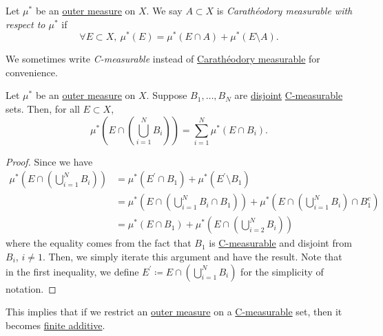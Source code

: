 \begin{definition}\label{def:C-measurable}
	Let \(\mu^{\ast} \) be an \hyperref[def:outer-measure]{outer measure} on \(X\). We say \(A\subset X\) is \emph{Carathéodory measurable with respect to \(\mu^{\ast} \)} if
	\[
		\forall E\subset X,\ \mu^{\ast} (E) = \mu^{\ast} \left(E\cap A\right) + \mu^{\ast} \left(E\setminus A\right).
	\]
\end{definition}
\begin{note}
	We sometimes write \emph{C-measurable} instead of \hyperref[def:C-measurable]{Carathéodory measurable} for convenience.
\end{note}
\begin{lemma}\label{lma:disjoint-C-measurable-finite-additive}
	Let \(\mu^{\ast} \) be an \hyperref[def:outer-measure]{outer measure} on \(X\). Suppose \(B_1, \dots , B_N \) are \underline{disjoint} \hyperref[def:C-measurable]{C-measurable} sets. Then, for all \(E\subset X\),
	\[
		\mu^{\ast} \left(E\cap \left(\bigcup_{i=1}^{N} B_{i}\right)\right) = \sum_{i=1}^{N} \mu^{\ast} \left(E\cap B_i\right).
	\]
\end{lemma}
\begin{proof}
	Since we have
	\[
		\begin{split}
			\mu^{\ast} \left(E\cap \left(\bigcup_{i=1}^{N} B_{i}\right)\right)
			 & = \mu^{\ast} \left( E^\prime  \cap B_1\right) + \mu^{\ast} \left(E ^\prime \setminus B_1\right)                                                               \\
			 & = \mu^{\ast} \left(E\cap \left(\bigcup_{i=1}^{N} B_{i}\cap B_1\right)\right) + \mu^{\ast} \left(E\cap \left(\bigcup_{i=1}^{N} B_{i}\right)\cap B^{c}_1\right) \\
			 & = \mu^{\ast} (E\cap B_1) + \mu^{\ast} \left(E\cap \left(\bigcup_{i=2}^{N} B_{i}\right)\right)
		\end{split}
	\]
	where the equality comes from the fact that \(B_1 \) is \hyperref[def:C-measurable]{C-measurable} and disjoint from \(B_{i}\), \(i\neq 1\). Then, we simply iterate this argument and have the result. Note that in the first inequality, we define \(E ^\prime\coloneqq E\cap \left(\bigcup_{i=1}^{N} B_{i}\right)\) for the simplicity of notation.
\end{proof}
\begin{remark}
	This implies that if we restrict an \hyperref[def:outer-measure]{outer measure} on a \hyperref[def:C-measurable]{C-measurable} set, then it becomes \underline{finite additive}.
\end{remark}

